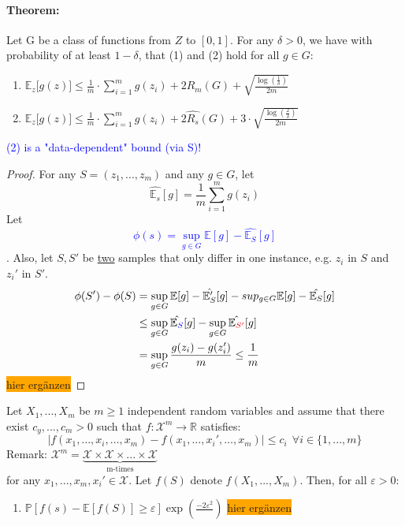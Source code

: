 \documentclass[10pt,a4paper]{article}
\theoremstyle{definition}
\theoremstyle{plain}
\begin{document}
\paragraph{Theorem:} Let G be a class of functions from $Z$ to $[0,1]$. For any $\delta > 0$, we have with probability of at least $1-\delta$, that (1) and (2) hold for all $g \in G$:
\begin{enumerate}
	\item $\mathbb{E}_z \big[g(z)\big] \leq \frac{1}{m} \cdot \sum_{i = 1}^{m} g(z_i) + 2 R_m (G) + \sqrt{\frac{\log(\frac{1}{\delta})}{2m}}$
	\item $\mathbb{E}_z \big[g(z)\big] \leq \frac{1}{m} \cdot \sum_{i = 1}^{m} g(z_i) + 2 \hat{R_s} (G) + 3 \cdot \sqrt{\frac{\log(\frac{2}{\delta})}{2m}}$
\end{enumerate}
\textcolor{blue}{(2) is a "data-dependent" bound (via S)!}
\begin{proof}
	For any $S = (z_1, ..., z_m)$ and any $g \in G$, let
	$$
		\hat{\mathbb{E}_s}[g] = \frac{1}{m} \sum_{i = 1}^{m} g(z_i)
	$$
	Let \textcolor{blue}{$$\phi(s) = \sup_{g \in G} \mathbb{E}[g] - \hat{\mathbb{E}_S}[g]$$}. Also, let $S, S'$ be \underline{two} samples that only differ in one instance, e.g. $z_i$ in $S$ and $z_{i}'$ in $S'$.
	\begin{align*}
		\phi(S')-\phi(S) &= \sup_{g \in G} \mathbb{E}[g] - \hat{\mathbb{E}_S'}[g] - sup_{g \in G} \mathbb{E}[g] - \hat{\mathbb{E}_S}[g]\\
		&\leq  \sup_{g \in G} \hat{\mathbb{E}_{\textcolor{blue}{S}}}[g] - \sup_{g \in G} \hat{\mathbb{E}_{\textcolor{red}{S'}}}[g]\\
		&= \sup_{g \in G} \frac{g(z_i) - g(z_{i}')}{m} \leq \frac{1}{m}
	\end{align*}
	\colorbox{orange}{hier ergänzen}
\end{proof}

\begin{boxeddef}
	Let $X_1, ..., X_m$ be $m \geq 1$ independent random variables and assume that there exist $c_y, ..., c_m > 0$ such that $f: \mathcal{X}^m \to \mathbb{R}$ satisfies:
	$$
		\bigg|f(x_1, \hdots , x_i, \hdots, x_m) - f(x_1, \hdots, x_{i}', \hdots, x_m) \bigg| \leq c_i \ \ \forall i \in \{ 1, ..., m \}
	$$
	Remark: $\mathcal{X}^m = \underbrace{\mathcal{X} \times \mathcal{X} \times ... \times \mathcal{X}}_{\text{m-times}}$\\
	
	for any $x_1, ..., x_m, x_{i}' \in \mathcal{X}$. Let $f(S)$ denote $f(X_1, ..., X_m)$. Then, for all $\varepsilon > 0$:
	\begin{enumerate}
		\item $\mathbb{P}[f(s) - \mathbb{E}[f(S)] \geq \varepsilon] \exp (\frac{-2\varepsilon^2}{})$
		\colorbox{orange}{hier ergänzen}
	\end{enumerate}
\end{boxeddef}
\end{document}
